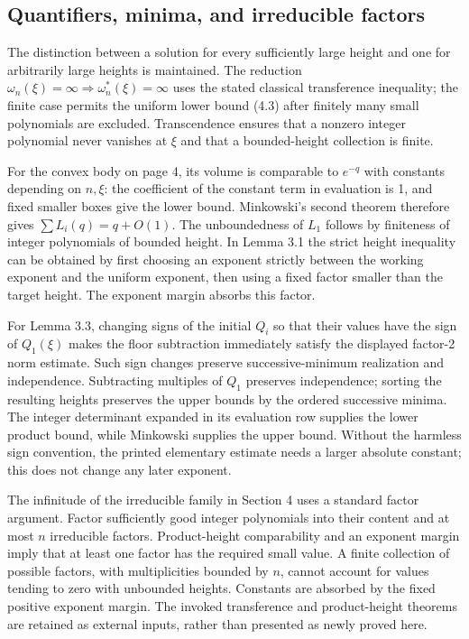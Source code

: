 \documentclass[10pt]{article}
\begin{document}
\subsection*{Quantifiers, minima, and irreducible factors}
The distinction between a solution for every sufficiently large height and one for arbitrarily large heights is maintained. The reduction \(\omega_n(\xi)=\infty\Rightarrow\omega_n^*(\xi)=\infty\) uses the stated classical transference inequality; the finite case permits the uniform lower bound (4.3) after finitely many small polynomials are excluded. Transcendence ensures that a nonzero integer polynomial never vanishes at \(\xi\) and that a bounded-height collection is finite.\par
For the convex body on page 4, its volume is comparable to \(e^{-q}\) with constants depending on \(n,\xi\): the coefficient of the constant term in evaluation is 1, and fixed smaller boxes give the lower bound. Minkowski’s second theorem therefore gives \(\sum L_i(q)=q+O(1)\). The unboundedness of \(L_1\) follows by finiteness of integer polynomials of bounded height. In Lemma 3.1 the strict height inequality can be obtained by first choosing an exponent strictly between the working exponent and the uniform exponent, then using a fixed factor smaller than the target height. The exponent margin absorbs this factor.\par
For Lemma 3.3, changing signs of the initial \(Q_i\) so that their values have the sign of \(Q_1(\xi)\) makes the floor subtraction immediately satisfy the displayed factor-2 norm estimate. Such sign changes preserve successive-minimum realization and independence. Subtracting multiples of \(Q_1\) preserves independence; sorting the resulting heights preserves the upper bounds by the ordered successive minima. The integer determinant expanded in its evaluation row supplies the lower product bound, while Minkowski supplies the upper bound. Without the harmless sign convention, the printed elementary estimate needs a larger absolute constant; this does not change any later exponent.\par
The infinitude of the irreducible family in Section 4 uses a standard factor argument. Factor sufficiently good integer polynomials into their content and at most \(n\) irreducible factors. Product-height comparability and an exponent margin imply that at least one factor has the required small value. A finite collection of possible factors, with multiplicities bounded by \(n\), cannot account for values tending to zero with unbounded heights. Constants are absorbed by the fixed positive exponent margin. The invoked transference and product-height theorems are retained as external inputs, rather than presented as newly proved here.\par
\end{document}
